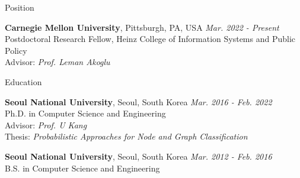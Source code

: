 \documentclass{resume} %
\begin{document}

\begin{rSection}{Position}

\textbf{Carnegie Mellon University}, Pittsburgh, PA, USA \hfill \emph{Mar. 2022 - Present} \\ 
Postdoctoral Research Fellow, Heinz College of Information Systems and Public Policy \\
Advisor: \emph{Prof. Leman Akoglu}

\end{rSection}


\begin{rSection}{Education}

\textbf{Seoul National University}, Seoul, South Korea \hfill \emph{Mar. 2016 - Feb. 2022} \\ 
Ph.D. in Computer Science and Engineering \\
Advisor: \emph{Prof. U Kang} \\
Thesis: \emph{Probabilistic Approaches for Node and Graph Classification}

\textbf{Seoul National University}, Seoul, South Korea \hfill \emph{Mar. 2012 - Feb. 2016} \\ 
B.S. in Computer Science and Engineering

\end{rSection}

\end{document}
